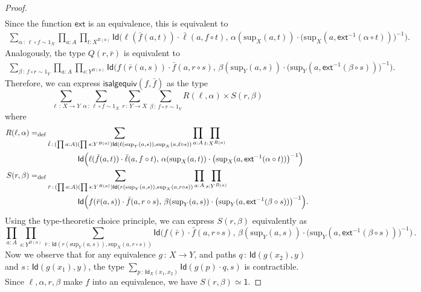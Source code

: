 \documentclass[10pt,a4paper,oneside,reqno]{amsart}
\theoremstyle{mythm}
\theoremstyle{mydef}
\theoremstyle{myrmk}
\newcommand{\defeq}{=_{\mathrm{def}}}
\newcommand{\co}{\,{:}\,}
\newcommand{\com}{\circ}
\newcommand{\ct}{\cdot}
\newcommand{\ext}{\mathsf{ext}}
\newcommand{\one}{\mathsf{1}}
\newcommand{\Id}{\mathsf{Id}}
\renewcommand{\sup}{\mathrm{sup}}
\begin{document}
\begin{proof}
\begin{align*}
\end{align*}
Since the function $\ext$ is an equivalence, this is equivalent to
\begin{align*}
\sum_{ \alpha \co \ell \circ f \sim 1{_X}} \prod_{a:A} \prod_{t: X^{B(a)}} 
	\Id\Big(\ell(\bar{f}(a,t)) \ct \bar{\ell}(a, f \com t),\, \alpha(\sup_X(a,t)) \ct \big(\sup_X(a, \ext^{-1}(\alpha \circ t))\big)^{-1}\Big).
\end{align*}
Analogously, the type $Q(r,\bar{r})$ is equivalent to
\begin{align*}
\sum_{ \beta \co f \com r \sim 1{_Y}} \prod_{a:A} \prod_{s: Y^{B(a)}} 
\Id\Big(f(\bar{r}(a,s)) \ct \bar{f}(a, r \com s),\, \beta(\sup_Y(a,s)) \ct \big(\sup_Y(a,\ext^{-1}(\beta \circ s))\big)^{-1}\Big).
\end{align*}
Therefore, we can express $\mathsf{isalgequiv}(f,\bar{f})$ as the type
\[ \sum_{\ell \co X\to Y} \sum_{\alpha \co \ell \circ f \sim 1_X} \sum_{r \co Y\to X} \sum_{\beta \co f \circ r \sim 1_Y}
	R(\ell,\alpha) \times S(r,\beta)\]
where
\begin{align*}
R(\ell,\alpha) \defeq& \sum_{\bar{\ell} \co (\prod a:A) (\prod s:Y^{B(a)}) \Id(\ell(\sup_Y(a,s)), \sup_X(a,\ell \circ s))}
	 \prod_{a:A}\prod_{t: X^{B(a)}}\\
		&\strut\qquad\qquad \Id\Big(\ell(\bar{f}(a,t)) \ct \bar{\ell}(a, f \com t),\, \alpha(\sup_X(a,t)) \ct \big(\sup_X(a,\ext^{-1}(\alpha \circ t))\big)^{-1}\Big) \\
S(r,\beta) \defeq& \sum_{\bar{r} \co (\prod a:A) (\prod s:Y^{B(a)}) \Id(r(\sup_Y(a,s)), \sup_X(a,r\circ s))}
	 \prod_{a:A}\prod_{s: Y^{B(a)}}\\
	 		&\strut\qquad\qquad \Id\Big(f(\bar{r}(a,s)) \ct \bar{f}(a, r \com s),\, \beta(\sup_Y(a,s)) \ct \big(\sup_Y(a,\ext^{-1}(\beta \circ s))\big)^{-1}\Big).
\end{align*}
Using the type-theoretic choice principle, we can express $S(r,\beta)$ equivalently as
\[  
 \prod_{a:A}\prod_{s: Y^{B(a)}}
\sum_{\bar{r} \co \Id(r(\sup_Y(a,s)), \sup_X(a,r \circ s))}
\Id\Big(f(\bar{r}) \ct \bar{f}(a, r \com s) ,\, \beta(\sup_Y(a,s)) \ct \big(\sup_Y(a,\ext^{-1}(\beta \circ s))\big)^{-1}\Big) \, .
\]
Now we observe that for any equivalence $g \co X \to Y$, and paths $q \co \Id(g(x_2),y)$ and $s \co \Id(g(x_1),y)$, the type $\sum_{p \co \Id_X(x_1,x_2)} \Id(g(p) \ct q,s)$ is contractible. Since $\ell, \alpha, r, \beta$ make $f$ into an equivalence, we have $S(r,\beta) \simeq \one$.


\end{proof}
\end{document}
